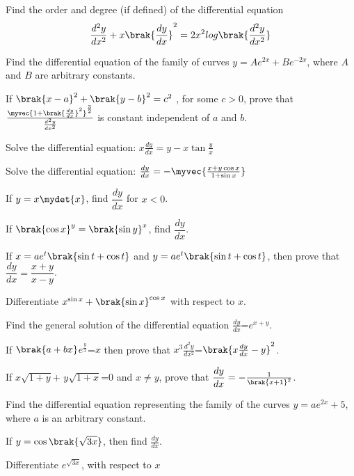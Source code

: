 
\item Find the order and degree (if defined) of the differential equation
\begin{align*}
    \frac{d^2y}{dx^2}+x\brak{\frac{dy}{dx}}^2=2x^2 log\brak{\frac{d^2y}{dx^2}}
\end{align*}
\item Find the differential equation of the family of curves ${y} = Ae^{2x} + Be^{-2x}$, where $A$ and $B$ are arbitrary constants.
\item If $\brak{x-a}^2 + \brak{y-b}^2 = {c}^2$ , for some $c > 0$, prove that
$ \frac{\myvec{ 1 + \brak{\frac{dy}{dx}}^2}^\frac{3}{2}}{\frac{d^2 y}{dx^2}} $ is constant independent of $a$ and $b$.
\item Solve the differential equation:
$x\frac{dy}{dx} = y - x\tan{\frac{y}{x}}$
\item Solve the differential equation:
$\frac{dy}{dx} =-\myvec{\frac{x + y \cos x}{ 1 + \sin x}}$
\item If $y=x\mydet{x}$, find $\dfrac{dy}{dx}$ for $x<0$.
\item If $\brak{\cos x}^y = \brak{\sin y }^x$, find $\dfrac{dy}{dx}$.
\item If $ x = ae^{t}\brak{\sin t + \cos t}$ and $y = ae^{t}\brak{\sin t + \cos t}$, then prove that
$\dfrac{dy}{dx} = \dfrac{x+y}{x-y}$.
\item Differentiate $ x^{\sin x} + \brak{\sin x}^{\cos x}$ with respect to $x$.
\item Find the general solution of the differential equation $\frac{dy}{dx}$=${e}^{x+y}$.
\item If $\brak{a+bx}$$e^\frac{y}{x}$=$x$  then prove that ${x^3}\frac{d^2y}{dx^2}$=$\brak{x\frac{dy}{dx}-y}^2$.
\item If $x\sqrt{1+y}$+ $y\sqrt{1+x}$=0 and $x\neq y$, prove that $\dfrac{dy}{dx} = -\frac{1}{\brak{x+1}^2}$.
\item Find the differential equation representing the family of the curves $y=ae^{2x}+5$, where $a$ is an arbitrary constant.
\item If $y=\cos \brak{\sqrt{3x}}$, then find $\frac{dy}{dx}$.
\item Differentiate $e^{\sqrt{3x}}$, with respect to $x$

